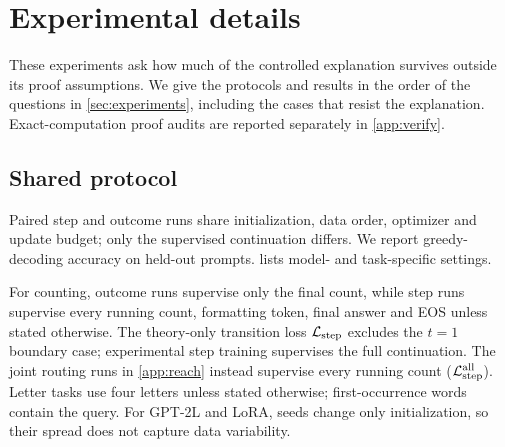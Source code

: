 \section{Experimental details}
\label{app:experiments}
\label{app:experimental-details}
These experiments ask how much of the controlled explanation survives outside its proof assumptions. We give the protocols and
results in the order of the questions in \cref{sec:experiments}, including the cases that resist the explanation. Exact-computation
proof audits are reported separately in \cref{app:verify}.

\subsection{Shared protocol}
\label{app:letter-protocol}
Paired step and outcome runs share initialization, data order, optimizer and update budget; only the supervised continuation differs.
We report greedy-decoding accuracy on held-out prompts.  lists model- and task-specific settings.

\begin{table}[H]
\centering\small
{}
\caption{\textbf{Shared experimental settings.} Task-specific exceptions are stated in the corresponding subsections.}
\label{tab:protocol}
\end{table}

For counting, outcome runs supervise only the final count, while step runs supervise every running count, formatting token,
final answer and EOS unless stated otherwise. The theory-only transition loss $\mathcal L_{\mathrm{step}}$ excludes the $t=1$ boundary case;
experimental step training supervises the full continuation. The joint routing runs in \cref{app:reach} instead supervise
every running count ($\mathcal L_{\mathrm{step}}^{\mathrm{all}}$). Letter tasks use four letters unless stated otherwise; first-occurrence words contain the query.
For GPT-2L and LoRA, seeds change only initialization, so their spread does not capture data variability.

